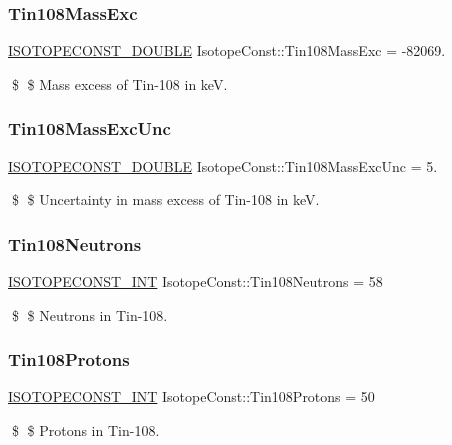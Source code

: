 \subsubsection{\texorpdfstring{Tin108\+Mass\+Exc}{Tin108MassExc}}
{\footnotesize\ttfamily \mbox{\hyperlink{group___isotope_const-_macros_ga8f45a7272ce02c0b4c65c44636ed719a}{I\+S\+O\+T\+O\+P\+E\+C\+O\+N\+S\+T\+\_\+\+D\+O\+U\+B\+LE}} Isotope\+Const\+::\+Tin108\+Mass\+Exc = -\/82069.}

\$ \$ Mass excess of Tin-\/108 in keV. \mbox{\label{group___isotope_const-_tin-_sn108_ga9e9387e32e2eabe493f7c245f49f02ce}} 
\subsubsection{\texorpdfstring{Tin108\+Mass\+Exc\+Unc}{Tin108MassExcUnc}}
{\footnotesize\ttfamily \mbox{\hyperlink{group___isotope_const-_macros_ga8f45a7272ce02c0b4c65c44636ed719a}{I\+S\+O\+T\+O\+P\+E\+C\+O\+N\+S\+T\+\_\+\+D\+O\+U\+B\+LE}} Isotope\+Const\+::\+Tin108\+Mass\+Exc\+Unc = 5.}

\$ \$ Uncertainty in mass excess of Tin-\/108 in keV. \mbox{\label{group___isotope_const-_tin-_sn108_ga63b177043f77e725d703765bbf19c0cf}} 
\subsubsection{\texorpdfstring{Tin108\+Neutrons}{Tin108Neutrons}}
{\footnotesize\ttfamily \mbox{\hyperlink{group___isotope_const-_macros_ga5f18360b3e99483a35c32d789e62621c}{I\+S\+O\+T\+O\+P\+E\+C\+O\+N\+S\+T\+\_\+\+I\+NT}} Isotope\+Const\+::\+Tin108\+Neutrons = 58}

\$ \$ Neutrons in Tin-\/108. \mbox{\label{group___isotope_const-_tin-_sn108_gabcc40af0abf98424e21a83e20d9cf9de}} 
\subsubsection{\texorpdfstring{Tin108\+Protons}{Tin108Protons}}
{\footnotesize\ttfamily \mbox{\hyperlink{group___isotope_const-_macros_ga5f18360b3e99483a35c32d789e62621c}{I\+S\+O\+T\+O\+P\+E\+C\+O\+N\+S\+T\+\_\+\+I\+NT}} Isotope\+Const\+::\+Tin108\+Protons = 50}

\$ \$ Protons in Tin-\/108. 